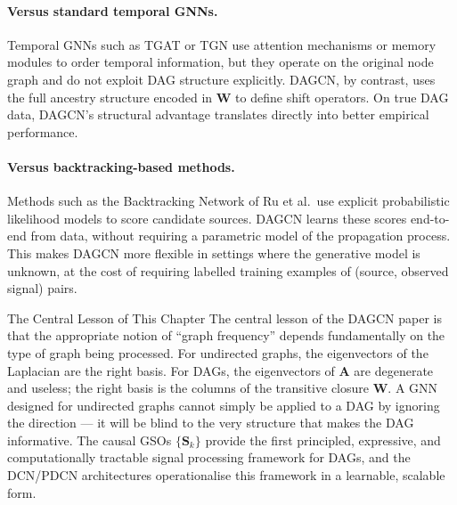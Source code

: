 \paragraph{Versus standard temporal GNNs.} Temporal GNNs such as TGAT or
TGN use attention mechanisms or memory modules to order temporal information,
but they operate on the original node graph and do not exploit DAG structure
explicitly. DAGCN, by contrast, uses the full ancestry structure encoded in
$\mathbf{W}$ to define shift operators. On true DAG data, DAGCN's structural
advantage translates directly into better empirical performance.

\paragraph{Versus backtracking-based methods.} Methods such as the
Backtracking Network of Ru et al.\ use explicit probabilistic likelihood models
to score candidate sources. DAGCN learns these scores end-to-end from data,
without requiring a parametric model of the propagation process. This makes
DAGCN more flexible in settings where the generative model is unknown, at the
cost of requiring labelled training examples of (source, observed signal) pairs.

\begin{keyinsight}{The Central Lesson of This Chapter}
The central lesson of the DAGCN paper is that the appropriate notion of
``graph frequency'' depends fundamentally on the type of graph being processed.
For undirected graphs, the eigenvectors of the Laplacian are the right basis.
For DAGs, the eigenvectors of $\mathbf{A}$ are degenerate and useless; the
right basis is the columns of the transitive closure $\mathbf{W}$. A GNN
designed for undirected graphs cannot simply be applied to a DAG by ignoring
the direction --- it will be blind to the very structure that makes the DAG
informative. The causal GSOs $\{\mathbf{S}_k\}$ provide the first principled,
expressive, and computationally tractable signal processing framework for DAGs,
and the DCN/PDCN architectures operationalise this framework in a learnable,
scalable form.
\end{keyinsight}
